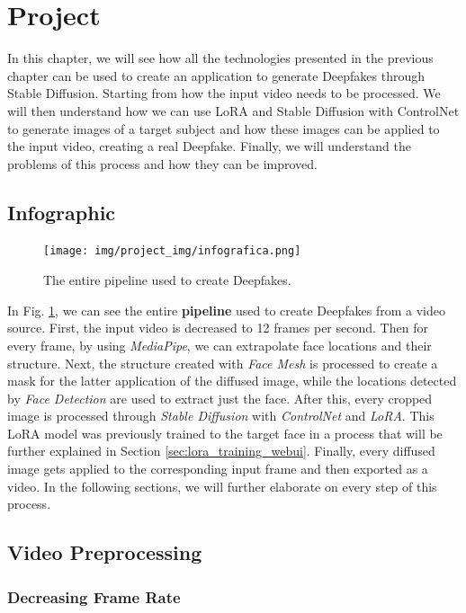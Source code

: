 \documentclass[preprint]{elsarticle}
\begin{document}
\section{Project} \label{ch:project}
In this chapter, we will see how all the technologies presented in the previous 
chapter can be used to create an application to generate Deepfakes through Stable Diffusion. 
Starting from how the input video needs to be processed. 
We will then understand how we can use LoRA and Stable Diffusion with ControlNet to 
generate images of a target subject and how these images can be applied to the input video, 
creating a real Deepfake. 
Finally, we will understand the problems of this process and how they can be improved.
\subsection{Infographic} \label{sec:project_info}
\begin{figure}[H]
	\centering
	\texttt{[image: img/project\_img/infografica.png]}
	\caption{The entire pipeline used to create Deepfakes.}
	\label{fig:project}
	
	
\end{figure}
In Fig. \ref{fig:project}, we can see the entire \textbf{pipeline} used to create Deepfakes from a video source. 
First, the input video is decreased to 12 frames per second. 
Then for every frame, by using \emph{MediaPipe}, we can extrapolate face locations and their structure. 
Next, the structure created with \emph{Face Mesh} is processed to create a mask for the latter application of the diffused image, 
while the locations detected by \emph{Face Detection} are used to extract just the face.
After this, every cropped image is processed through \emph{Stable Diffusion} with \emph{ControlNet} and \emph{LoRA}. 
This LoRA model was previously trained to the target face in a process that will be further explained in Section \ref{sec:lora_training_webui}. 
Finally, every diffused image gets applied to the corresponding input frame and then exported as a video. 
In the following sections, we will further elaborate on every step of this process. 

\subsection{Video Preprocessing} \label{sec:video_preprocessing}

\subsubsection{Decreasing Frame Rate} \label{sec:decreasing_frame_rate}
\end{document}
